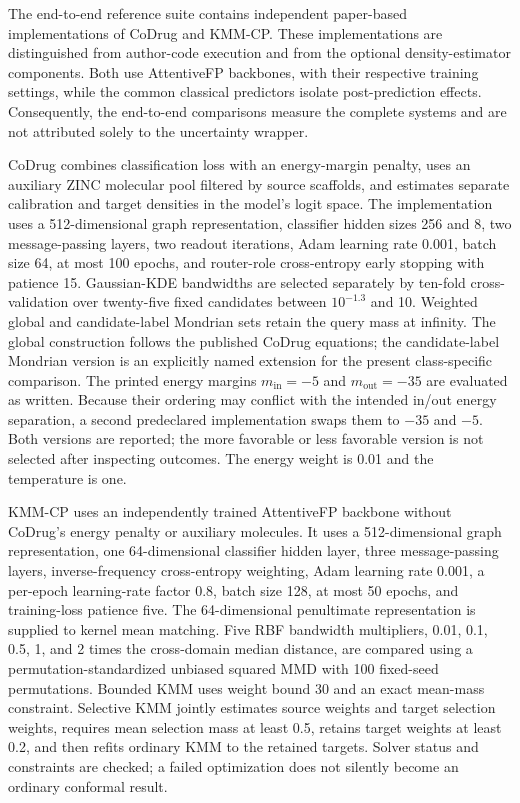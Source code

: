 \documentclass[11pt]{article}
\begin{document}
The end-to-end reference suite contains independent paper-based implementations of CoDrug and KMM-CP. These implementations are distinguished from author-code execution and from the optional density-estimator components. Both use AttentiveFP backbones, with their respective training settings, while the common classical predictors isolate post-prediction effects. Consequently, the end-to-end comparisons measure the complete systems and are not attributed solely to the uncertainty wrapper.

CoDrug combines classification loss with an energy-margin penalty, uses an auxiliary ZINC molecular pool filtered by source scaffolds, and estimates separate calibration and target densities in the model's logit space. The implementation uses a 512-dimensional graph representation, classifier hidden sizes 256 and 8, two message-passing layers, two readout iterations, Adam learning rate 0.001, batch size 64, at most 100 epochs, and router-role cross-entropy early stopping with patience 15. Gaussian-KDE bandwidths are selected separately by ten-fold cross-validation over twenty-five fixed candidates between $10^{-1.3}$ and 10. Weighted global and candidate-label Mondrian sets retain the query mass at infinity. The global construction follows the published CoDrug equations; the candidate-label Mondrian version is an explicitly named extension for the present class-specific comparison. The printed energy margins $m_{\mathrm{in}}=-5$ and $m_{\mathrm{out}}=-35$ are evaluated as written. Because their ordering may conflict with the intended in/out energy separation, a second predeclared implementation swaps them to $-35$ and $-5$. Both versions are reported; the more favorable or less favorable version is not selected after inspecting outcomes. The energy weight is 0.01 and the temperature is one.

KMM-CP uses an independently trained AttentiveFP backbone without CoDrug's energy penalty or auxiliary molecules. It uses a 512-dimensional graph representation, one 64-dimensional classifier hidden layer, three message-passing layers, inverse-frequency cross-entropy weighting, Adam learning rate 0.001, a per-epoch learning-rate factor 0.8, batch size 128, at most 50 epochs, and training-loss patience five. The 64-dimensional penultimate representation is supplied to kernel mean matching. Five RBF bandwidth multipliers, 0.01, 0.1, 0.5, 1, and 2 times the cross-domain median distance, are compared using a permutation-standardized unbiased squared MMD with 100 fixed-seed permutations. Bounded KMM uses weight bound 30 and an exact mean-mass constraint. Selective KMM jointly estimates source weights and target selection weights, requires mean selection mass at least 0.5, retains target weights at least 0.2, and then refits ordinary KMM to the retained targets. Solver status and constraints are checked; a failed optimization does not silently become an ordinary conformal result.
\end{document}
